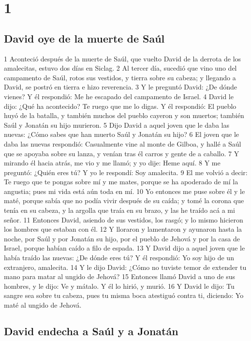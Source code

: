 
\chapter{1}

\section*{David oye de la muerte de Saúl}

1 Aconteció después de la muerte de Saúl, que vuelto David de la derrota de los amalecitas, estuvo dos días en Siclag.
2 Al tercer día, sucedió que vino uno del campamento de Saúl, rotos sus vestidos, y tierra sobre su cabeza; y llegando a David, se postró en tierra e hizo reverencia.
3 Y le preguntó David: ¿De dónde vienes? Y él respondió: Me he escapado del campamento de Israel.
4 David le dijo: ¿Qué ha acontecido? Te ruego que me lo digas. Y él respondió: El pueblo huyó de la batalla, y también muchos del pueblo cayeron y son muertos; también Saúl y Jonatán su hijo murieron.
5 Dijo David a aquel joven que le daba las nuevas: ¿Cómo sabes que han muerto Saúl y Jonatán su hijo?
6 El joven que le daba las nuevas respondió: Casualmente vine al monte de Gilboa, y hallé a Saúl que se apoyaba sobre su lanza, y venían tras él carros y gente de a caballo.
7 Y mirando él hacia atrás, me vio y me llamó; y yo dije: Heme aquí.
8 Y me preguntó: ¿Quién eres tú? Y yo le respondí: Soy amalecita.
9 El me volvió a decir: Te ruego que te pongas sobre mí y me mates, porque se ha apoderado de mí la angustia; pues mi vida está aún toda en mí.
10 Yo entonces me puse sobre él y le maté, porque sabía que no podía vivir después de su caída; y tomé la corona que tenía en su cabeza, y la argolla que traía en su brazo, y las he traído acá a mi señor. 
11 Entonces David, asiendo de sus vestidos, los rasgó; y lo mismo hicieron los hombres que estaban con él.
12 Y lloraron y lamentaron y ayunaron hasta la noche, por Saúl y por Jonatán su hijo, por el pueblo de Jehová y por la casa de Israel, porque habían caído a filo de espada.
13 Y David dijo a aquel joven que le había traído las nuevas: ¿De dónde eres tú? Y él respondió: Yo soy hijo de un extranjero, amalecita.
14 Y le dijo David: ¿Cómo no tuviste temor de extender tu mano para matar al ungido de Jehová?
15 Entonces llamó David a uno de sus hombres, y le dijo: Ve y mátalo. Y él lo hirió, y murió.
16 Y David le dijo: Tu sangre sea sobre tu cabeza, pues tu misma boca atestiguó contra ti, diciendo: Yo maté al ungido de Jehová.
\section*{David endecha a Saúl y a Jonatán}

